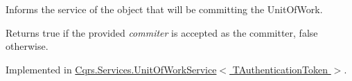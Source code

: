 Informs the service of the object that will be committing the Unit\+Of\+Work. 

\begin{DoxyReturn}{Returns}
true if the provided {\itshape commiter}  is accepted as the committer, false otherwise. 
\end{DoxyReturn}


Implemented in \hyperlink{classCqrs_1_1Services_1_1UnitOfWorkService_a663471bc62f79df22c800ad683a27f59_a663471bc62f79df22c800ad683a27f59}{Cqrs.\+Services.\+Unit\+Of\+Work\+Service$<$ T\+Authentication\+Token $>$}.

